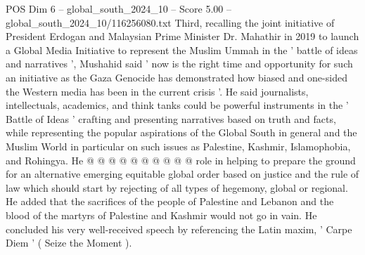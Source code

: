 \begin{textsample}{POS Dim 6 – global\_south\_2024\_10 – Score 5.00 – global\_south\_2024\_10/116256080.txt}
Third, recalling the joint initiative of President Erdogan and Malaysian Prime Minister Dr.
Mahathir in 2019 to launch a Global Media Initiative to represent the Muslim Ummah in the ' battle of ideas and narratives ', Mushahid said ' now is the right time and opportunity for such an initiative as the Gaza Genocide has demonstrated how biased and one-sided the Western media has been in the current crisis '.
He said journalists, intellectuals, academics, and think tanks could be powerful instruments in the ' Battle of Ideas ' crafting and presenting narratives based on truth and facts, while representing the popular aspirations of the Global South in general and the Muslim World in particular on such issues as Palestine, Kashmir, Islamophobia, and Rohingya.
He @ @ @ @ @ @ @ @ @ @ role in helping to prepare the ground for an alternative emerging equitable global order based on justice and the rule of law which should start by rejecting of all types of hegemony, global or regional.
He added that the sacrifices of the people of Palestine and Lebanon and the blood of the martyrs of Palestine and Kashmir would not go in vain.
He concluded his very well-received speech by referencing the Latin maxim, ' Carpe Diem ' ( Seize the Moment ).

\end{textsample}
